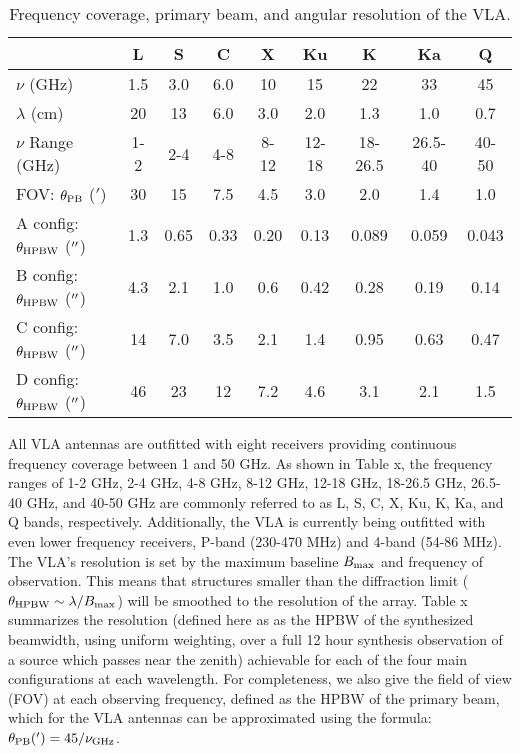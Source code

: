 \begin{table}
\begin{center}
\caption[Frequency coverage, primary beam, and angular resolution of the VLA.]
{Frequency coverage, primary beam, and angular resolution of the VLA.}
\begin{tabular}{lcccccccc}
\hline
\hline
\rule{0pt}{2.5ex} &  L& S&C&X&Ku&K&Ka&Q\\
\hline
\rule{0pt}{2.5ex}$\nu$ (GHz)& 1.5& 3.0&6.0&10&15&22&33&45\\
$\lambda$ (cm)& 20& 13&6.0&3.0&2.0&1.3&1.0&0.7\\
$\nu$ Range (GHz)& 1-2& 2-4&4-8&8-12&12-18&18-26.5&26.5-40&40-50\\
FOV: $\theta_{\rm{PB}}$ ($'$)& 30& 15&7.5 &4.5 &3.0&2.0&1.4&1.0\\
A config: $\theta_{\rm{HPBW}}$ ($^{\prime\prime}$)&  1.3& 0.65&0.33&0.20&0.13&0.089&0.059&0.043\\
B config: $\theta_{\rm{HPBW}}$ ($^{\prime\prime}$)&  4.3& 2.1&1.0&0.6&0.42&0.28&0.19&0.14\\
C config: $\theta_{\rm{HPBW}}$ ($^{\prime\prime}$)&  14& 7.0&3.5&2.1&1.4&0.95&0.63&0.47\\
D config: $\theta_{\rm{HPBW}}$ ($^{\prime\prime}$)&  46& 23&12&7.2&4.6&3.1&2.1&1.5\\
\hline
\end{tabular}
\label{tab:3.1}
\end{center}
\end{table}
All VLA antennas are outfitted with eight receivers providing continuous frequency coverage between 1 and 50 GHz. As shown in Table x, the frequency ranges of 1-2 GHz, 2-4 GHz, 4-8 GHz, 8-12 GHz, 12-18 GHz, 18-26.5 GHz, 26.5-40 GHz, and 40-50 GHz are commonly referred to as L, S, C, X, Ku, K, Ka, and Q bands, respectively. Additionally, the VLA is currently being outfitted with even lower frequency receivers, P-band (230-470 MHz) and 4-band (54-86 MHz). The VLA's resolution is set by the maximum baseline $B_{\rm{max}}$ and frequency of observation. This means that structures smaller than the diffraction limit ($\theta_{\rm{HPBW}} \sim \lambda/B_{\rm{max}}$) will be smoothed to the resolution of the array. Table x summarizes the resolution (defined here as as the HPBW of the synthesized beamwidth, using uniform weighting, over a full 12 hour synthesis observation of a source which passes near the zenith) achievable for each of the four main configurations at each wavelength. For completeness, we also give the field of view (FOV) at each observing frequency, defined as the HPBW  of the primary beam, which for the VLA antennas can be approximated using the formula: $\theta _{\rm{PB}} (')= 45/\nu _{\rm{GHz}}$. 

